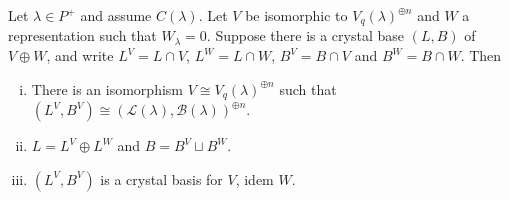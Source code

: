 \documentclass[11pt,fleqn]{article}
\newcommand\B{\mathcal B}
\renewcommand\L{\mathcal L}
\begin{document}
\begin{Proposition}
\label{decomposition}
	Let $\lambda \in P^+$ and assume $C(\lambda)$. Let $V$ be isomorphic to
$V_q(\lambda)^{\oplus n}$ and $W$ a representation such that $W_\lambda = 0$. Suppose
there is a crystal base $(L,B)$ of $V \oplus W$, and write $L^V = L \cap V$, $L^W = L \cap
W$, $B^V = B \cap V$ and $B^W = B \cap W$. Then
	\begin{enumerate}[(i)]
		\item There is an isomorphism $V \cong V_q(\lambda)^{\oplus n}$ such that
			$(L^V,B^V) \cong (\L(\lambda),\B(\lambda))^{\oplus n}$.
		\item $L = L^V \oplus L^W$ and $B = B^V \sqcup B^W$.
		\item $(L^V, B^V)$ is a crystal basis for $V$, idem $W$.
	\end{enumerate}
\end{Proposition}
\end{document}

